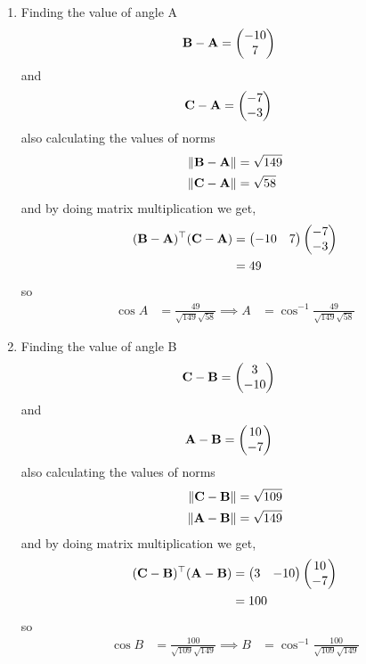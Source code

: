 \documentclass[11pt]{book}
\begin{document}
\begin{enumerate}[label=\thesection.\arabic*.,ref=\thesection.\theenumi]
\begin{enumerate}
\item Finding the value of angle A
\begin{align}
	\mathbf{B}-\mathbf{A} &=\begin{pmatrix}-10\\7\end{pmatrix}
\end{align}
and 
\begin{align}
	\mathbf{C}-\mathbf{A}&= \begin{pmatrix}-7\\-3\end{pmatrix}
\end{align}
also calculating the values of norms
\begin{align}
	\left\lVert\mathbf{B}-\mathbf{A}\right\rVert &= \sqrt{149} \\
	\left\lVert\mathbf{C}-\mathbf{A}\right\rVert &= \sqrt{58} 
\end{align}
and by doing matrix multiplication we get,
\begin{align}
\begin{split}
	(\mathbf{B}-\mathbf{A})^{\top}(\mathbf{C}-\mathbf{A})&=\begin{pmatrix}-10&7\end{pmatrix}\begin{pmatrix}-7\\-3\end{pmatrix}\\
	&=49
\end{split}
\end{align}
so 
\begin{align}
	\cos{A}&= \frac{49}{\sqrt{149} \sqrt{58}}
	\implies A&=\cos^{-1}{ \frac{49}{\sqrt{149} \sqrt{58}}}
\end{align}




\item Finding the value of angle B
\begin{align}
	\mathbf{C}-\mathbf{B} &=\begin{pmatrix}3\\-10\end{pmatrix}
\end{align}
and 
\begin{align}
	\mathbf{A}-\mathbf{B}&= \begin{pmatrix}10\\-7\end{pmatrix}
\end{align}
also calculating the values of norms
\begin{align}
	\left\lVert\mathbf{C}-\mathbf{B}\right\rVert &= \sqrt{109}\\
	\left\lVert\mathbf{A}-\mathbf{B}\right\rVert &= \sqrt{149}
\end{align}
and by doing matrix multiplication we get,
\begin{align}
\begin{split}
	(\mathbf{C}-\mathbf{B})^{\top}(\mathbf{A}-\mathbf{B})&=\begin{pmatrix}3&-10\end{pmatrix}\begin{pmatrix}10\\-7\end{pmatrix}\\
	&= 100
\end{split}
\end{align}
so 
\begin{align}
	\cos{B}&= \frac{100}{\sqrt{109} \sqrt{149}}
	\implies B&=\cos^{-1}{ \frac{100}{\sqrt{109} \sqrt{149}}}
\end{align}




\end{enumerate}
\end{enumerate}
\end{document}
